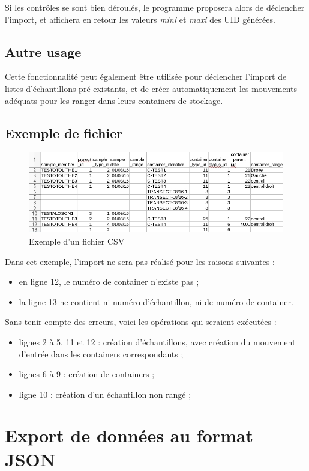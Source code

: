 Si les contrôles se sont bien déroulés, le programme proposera alors de déclencher l'import, et affichera en retour les valeurs \textit{mini} et \textit{maxi} des UID générées.

\subsection{Autre usage}
Cette fonctionnalité peut également être utilisée pour déclencher l'import de listes d'échantillons pré-existants, et de créer automatiquement les mouvements adéquats pour les ranger dans leurs containers de stockage.

\subsection{Exemple de fichier}
\begin{figure}[H]
\includegraphics[width=\linewidth]{images/importcsv}
\caption{Exemple d'un fichier CSV}
\end{figure}

Dans cet exemple, l'import ne sera pas réalisé pour les raisons suivantes :
\begin{itemize}
\item en ligne 12, le numéro de container n'existe pas ;
\item la ligne 13 ne contient ni numéro d'échantillon, ni de numéro de container.
\end{itemize}

Sans tenir compte des erreurs, voici les opérations qui seraient exécutées :
\begin{itemize}
\item lignes 2 à 5, 11 et 12 : création d'échantillons, avec création du mouvement d'entrée dans les containers correspondants ;
\item lignes 6 à 9 : création de containers ;
\item ligne 10 : création d'un échantillon non rangé ;
\end{itemize}

\section{Export de données au format JSON}

